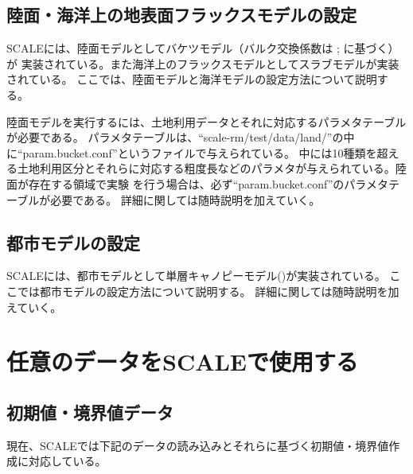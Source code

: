 \subsection{陸面・海洋上の地表面フラックスモデルの設定} \label{sec:adv_landocean}
SCALEには、陸面モデルとしてバケツモデル（バルク交換係数は \cite{beljaars_1991}; \cite{wilson_2001}に基づく）が
実装されている。また海洋上のフラックスモデルとしてスラブモデルが実装されている。
ここでは、陸面モデルと海洋モデルの設定方法について説明する。

陸面モデルを実行するには、土地利用データとそれに対応するパラメタテーブルが必要である。
パラメタテーブルは、``scale-rm/test/data/land/''の中に``param.bucket.conf''というファイルで与えられている。
中には10種類を超える土地利用区分とそれらに対応する粗度長などのパラメタが与えられている。陸面が存在する領域で実験
を行う場合は、必ず``param.bucket.conf''のパラメタテーブルが必要である。
詳細に関しては随時説明を加えていく。


\subsection{都市モデルの設定} \label{sec:adv_urban}
SCALEには、都市モデルとして単層キャノピーモデル(\cite{kusaka_2001})が実装されている。
ここでは都市モデルの設定方法について説明する。
詳細に関しては随時説明を加えていく。


\section{任意のデータをSCALEで使用する} \label{sec:adv_datainput}





\subsection{初期値・境界値データ} \label{sec:adv_bnddata}
現在、SCALEでは下記のデータの読み込みとそれらに基づく初期値・境界値作成に対応している。


